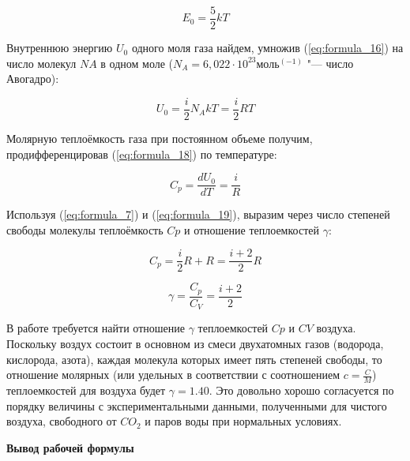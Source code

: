 \begin{equation}
    E_0 = \frac{5}{2} k T
    \label{eq:formula_17}
\end{equation}

Внутреннюю энергию $U_0$ одного моля газа найдем, умножив (\ref{eq:formula_16}) на число молекул $NA$ в одном моле ($N_A = 6,022 \cdot 10^23 \text{моль}^(-1)$ "--- число Авогадро):

\begin{equation}
    U_0 = \frac{i}{2} N_A k T = \frac{i}{2} R T
    \label{eq:formula_18}
\end{equation}

Молярную теплоёмкость газа при постоянном объеме получим, продифференцировав (\ref{eq:formula_18}) по температуре:

\begin{equation}
    C_p = \frac{d U_0}{d T} = \frac{i}{R}
    \label{eq:formula_19}
\end{equation}

Используя (\ref{eq:formula_7}) и (\ref{eq:formula_19}), выразим через число степеней свободы молекулы теплоёмкость $Cp$ и отношение теплоемкостей $\gamma$:

\begin{equation*}
    C_p = \frac{i}{2} R + R = \frac{i + 2}{2} R
\end{equation*}

\begin{equation*}
    \gamma = \frac{C_p}{C_V} = \frac{i + 2}{2}
\end{equation*}

В работе требуется найти отношение $\gamma$ теплоемкостей $Cp$ и $CV$ воздуха. Поскольку воздух состоит в основном из смеси двухатомных газов (водорода, кислорода, азота), каждая молекула которых имеет пять степеней свободы, то отношение молярных (или удельных в соответствии с соотношением $c = \frac{C}{M}$) теплоемкостей для воздуха будет $\gamma = 1.40$. Это довольно хорошо согласуется по порядку величины с экспериментальными данными, полученными для чистого воздуха, свободного от $CO_2$ и паров воды при нормальных условиях.

\begin{center}
    \textbf{Вывод рабочей формулы}
\end{center}

